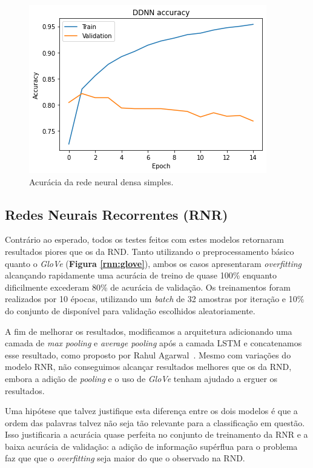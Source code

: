 \documentclass[twoside,conference,a4paper]{IEEEtran}
\begin{document}
\begin{figure}[ht]
\centering
\includegraphics[width=0.8\hsize]{figuras/dnn_simple.png}
\caption{Acurácia da rede neural densa simples.}
\label{dnn:basic}
\end{figure}

\subsection{Redes Neurais Recorrentes (RNR)}

    Contrário ao esperado, todos os testes feitos com estes modelos retornaram resultados piores que os da RND. Tanto utilizando o preprocessamento básico quanto o \textit{GloVe} (\textbf{Figura \ref{rnn:glove}}), ambos os casos apresentaram \textit{overfitting} alcançando rapidamente uma acurácia de treino de quase 100\% enquanto dificilmente excederam 80\% de acurácia de validação. Os treinamentos foram realizados por 10 épocas, utilizando um \textit{batch} de 32 amostras por iteração e 10\% do conjunto de disponível para validação escolhidos aleatoriamente.
    
    A fim de melhorar os resultados, modificamos a arquitetura adicionando uma camada de \textit{max pooling} e \textit{average pooling} após a camada LSTM e concatenamos esse resultado, como proposto por Rahul Agarwal~\cite{rnn-pooling}. Mesmo com variações do modelo RNR, não conseguimos alcançar resultados melhores que os da RND, embora a adição de \textit{pooling} e o uso de \textit{GloVe} tenham ajudado a erguer os resultados.
    
    Uma hipótese que talvez justifique esta diferença entre os dois modelos é que a ordem das palavras talvez não seja tão relevante para a classificação em questão. Isso justificaria a acurácia quase perfeita no conjunto de treinamento da RNR e a baixa acurácia de validação: a adição de informação supérflua para o problema faz que que o \textit{overfitting} seja maior do que o observado na RND.
\end{document}
